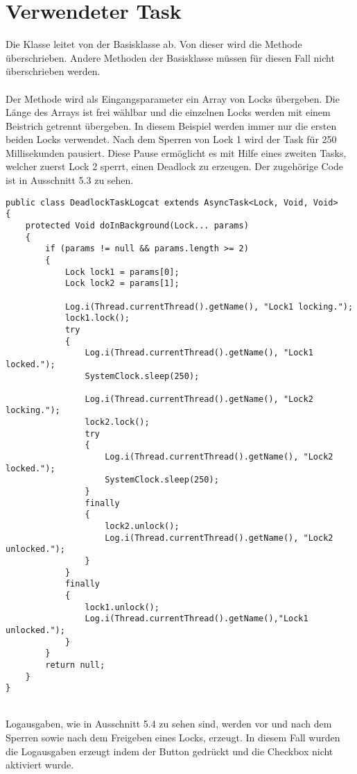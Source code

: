 \section{Verwendeter Task}
Die Klasse  leitet von der Basisklasse  ab. Von dieser wird die Methode  überschrieben. Andere Methoden der Basisklasse müssen für diesen Fall nicht überschrieben werden. 
\\
\\
Der Methode  wird als Eingangsparameter ein Array von Locks übergeben. Die Länge des Arrays ist frei wählbar und die einzelnen Locks werden mit einem Beistrich getrennt übergeben. In diesem Beispiel werden immer nur die ersten beiden Locks verwendet. Nach dem Sperren von Lock 1 wird der Task für 250 Millisekunden pausiert. Diese Pause ermöglicht es mit Hilfe eines zweiten Tasks, welcher zuerst Lock 2 sperrt, einen Deadlock zu erzeugen. Der zugehörige Code ist in Ausschnitt 5.3 zu sehen.
\\
\begin{lstlisting}[float,floatplacement=H,caption=Asynchroner Task]
public class DeadlockTaskLogcat extends AsyncTask<Lock, Void, Void>
{
    protected Void doInBackground(Lock... params)
    {
        if (params != null && params.length >= 2)
        {
            Lock lock1 = params[0];
            Lock lock2 = params[1];

            Log.i(Thread.currentThread().getName(), "Lock1 locking.");
            lock1.lock();
            try
            {
                Log.i(Thread.currentThread().getName(), "Lock1 locked.");
                SystemClock.sleep(250);

                Log.i(Thread.currentThread().getName(), "Lock2 locking.");
                lock2.lock();
                try
                {
                    Log.i(Thread.currentThread().getName(), "Lock2 locked.");
                    SystemClock.sleep(250);
                }
                finally
                {
                    lock2.unlock();
                    Log.i(Thread.currentThread().getName(), "Lock2 unlocked.");
                }
            }
            finally
            {
                lock1.unlock();
                Log.i(Thread.currentThread().getName(),"Lock1 unlocked.");
            }
        }
        return null;
    }
}
\end{lstlisting}
\\
Logausgaben, wie in Ausschnitt 5.4 zu sehen sind, werden vor und nach dem Sperren sowie nach dem Freigeben eines Locks, erzeugt. In diesem Fall wurden die Logausgaben erzeugt indem der Button  gedrückt und die Checkbox  nicht aktiviert wurde.


